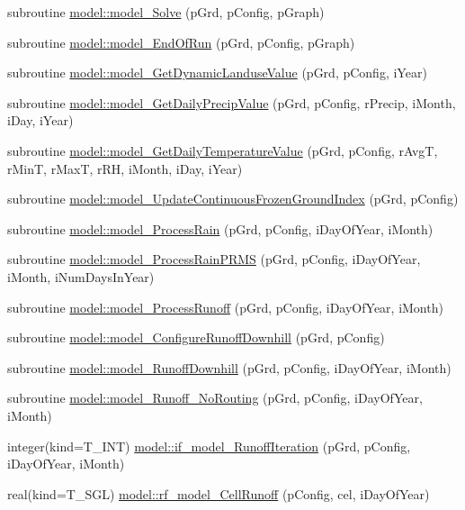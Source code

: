 \begin{DoxyCompactItemize}
\item 
subroutine \hyperlink{namespacemodel_a74378024436fef2323c5d8e78ae80789}{model::model\_\-Solve} (pGrd, pConfig, pGraph)
\item 
subroutine \hyperlink{namespacemodel_a114e44d3df7dfb8dc151a50dc04b0f54}{model::model\_\-EndOfRun} (pGrd, pConfig, pGraph)
\item 
subroutine \hyperlink{namespacemodel_a2f244ceb6a9954fc0f3854eda7fe237b}{model::model\_\-GetDynamicLanduseValue} (pGrd, pConfig, iYear)
\item 
subroutine \hyperlink{namespacemodel_ac13ac612394e6b11e1396e3a8f288b9a}{model::model\_\-GetDailyPrecipValue} (pGrd, pConfig, rPrecip, iMonth, iDay, iYear)
\item 
subroutine \hyperlink{namespacemodel_af8d22bdc2b1a6d127e2a5df3e587bec6}{model::model\_\-GetDailyTemperatureValue} (pGrd, pConfig, rAvgT, rMinT, rMaxT, rRH, iMonth, iDay, iYear)
\item 
subroutine \hyperlink{namespacemodel_ab74d4dbaafe53d302dd25391d9c43a68}{model::model\_\-UpdateContinuousFrozenGroundIndex} (pGrd, pConfig)
\item 
subroutine \hyperlink{namespacemodel_a121eef11acd312dcdd0ea21317c127ef}{model::model\_\-ProcessRain} (pGrd, pConfig, iDayOfYear, iMonth)
\item 
subroutine \hyperlink{namespacemodel_a6f38fcc336f9a766a37edf7771cf5285}{model::model\_\-ProcessRainPRMS} (pGrd, pConfig, iDayOfYear, iMonth, iNumDaysInYear)
\item 
subroutine \hyperlink{namespacemodel_a546c0d970e2db00e9f958a1a55f958ba}{model::model\_\-ProcessRunoff} (pGrd, pConfig, iDayOfYear, iMonth)
\item 
subroutine \hyperlink{namespacemodel_a2ea58c4ccfc2647d6db92e5ca190f79a}{model::model\_\-ConfigureRunoffDownhill} (pGrd, pConfig)
\item 
subroutine \hyperlink{namespacemodel_ab0f15bf6283861e18b4df7cb3ade2820}{model::model\_\-RunoffDownhill} (pGrd, pConfig, iDayOfYear, iMonth)
\item 
subroutine \hyperlink{namespacemodel_ae7fa0deca3e98388f15ccdd73dff4241}{model::model\_\-Runoff\_\-NoRouting} (pGrd, pConfig, iDayOfYear, iMonth)
\item 
integer(kind=T\_\-INT) \hyperlink{namespacemodel_a6ff4163ec4cc3501c34cd52c6693b5ce}{model::if\_\-model\_\-RunoffIteration} (pGrd, pConfig, iDayOfYear, iMonth)
\item 
real(kind=T\_\-SGL) \hyperlink{namespacemodel_ad02323b54a65796a101d7c54c188b9fd}{model::rf\_\-model\_\-CellRunoff} (pConfig, cel, iDayOfYear)

\end{DoxyCompactItemize}
